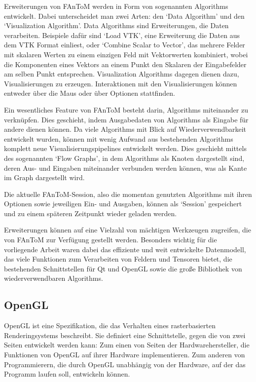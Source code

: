 \documentclass[a4paper,fontsize=12pt,toc=bib,halfparskip]{scrartcl}
\begin{document}
Erweiterungen von FAnToM werden in Form von sogenannten Algorithms entwickelt. Dabei unterscheidet man zwei Arten: den `Data Algorithm' und den `Visualization Algorithm'. Data Algorithms sind Erweiterungen, die Daten verarbeiten. Beispiele daf\"ur sind `Load VTK', eine Erweiterung die Daten aus dem VTK Format einliest, oder `Combine Scalar to Vector', das mehrere Felder mit skalaren Werten zu einem einzigen Feld mit Vektorwerten kombiniert, wobei die Komponenten eines Vektors an einem Punkt den Skalaren der Eingabefelder am selben Punkt entsprechen.
Visualization Algorithms dagegen dienen dazu, Visualisierungen zu erzeugen. Interaktionen mit den Visualisierungen k\"onnen entweder \"uber die Maus oder \"uber Optionen stattfinden.

Ein wesentliches Feature von FAnToM besteht darin, Algorithms miteinander zu verkn\"upfen. Dies geschieht, indem Ausgabedaten von Algorithms als Eingabe f\"ur andere dienen k\"onnen. Da viele Algorithms mit Blick auf Wiederverwendbarkeit entwickelt wurden, k\"onnen mit wenig Aufwand aus bestehenden Algorithms komplett neue Visualisierungspipelines entwickelt werden. Dies geschieht mittels des sogenannten `Flow Graphs', in dem Algorithms als Knoten dargestellt sind, deren Aus- und Eingaben miteinander verbunden werden k\"onnen, was als Kante im Graph dargestellt wird.

Die aktuelle FAnToM-Session, also die momentan genutzten Algorithms mit ihren Optionen sowie jeweiligen Ein- und Ausgaben, k\"onnen als `Session' gespeichert und zu einem sp\"ateren Zeitpunkt wieder geladen werden.

Erweiterungen k\"onnen auf eine Vielzahl von m\"achtigen Werkzeugen zugreifen, die von FAnToM zur Verf\"ugung gestellt werden. Besonders wichtig f\"ur die vorliegende Arbeit waren dabei das effiziente und weit entwickelte Datenmodell, das viele Funktionen zum Verarbeiten von Feldern und Tensoren bietet, die bestehenden Schnittstellen f\"ur Qt und OpenGL sowie die gro{\ss}e Bibliothek von wiederverwendbaren Algorithms.
\subsection{OpenGL}
\label{sec:OpenGL}
OpenGL\cite{openglWebsite} ist eine Spezifikation, die das Verhalten eines rasterbasierten Renderingsystems beschreibt. Sie definiert eine Schnittstelle, gegen die von zwei Seiten entwickelt werden kann: Zum einen von Seiten der Hardwarehersteller, die Funktionen von OpenGL auf ihrer Hardware implementieren. Zum anderen von Programmierern, die durch OpenGL unabh\"angig von der Hardware, auf der das Programm laufen soll, entwickeln k\"onnen. 
\end{document}
